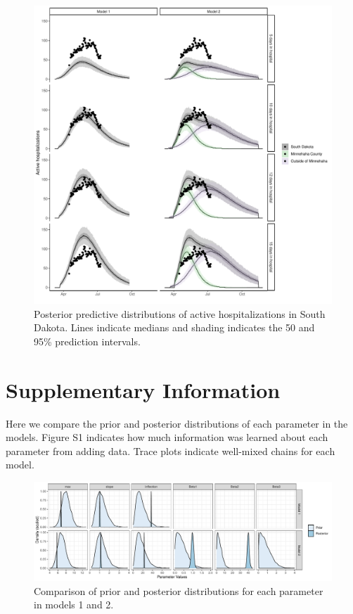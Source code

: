 \documentclass[
]{article}
\begin{document}
\begin{figure}
\centering
\includegraphics{manuscript_files/figure-latex/unnamed-chunk-5-1.pdf}
\caption{\label{fig:unnamed-chunk-5}Posterior predictive distributions of active hospitalizations in South Dakota. Lines indicate medians and shading indicates the 50 and 95\% prediction intervals.\label{active_daily_group:plot}}
\end{figure}

\newpage

\FloatBarrier

\hypertarget{supplementary-information}{%
\section{Supplementary Information}\label{supplementary-information}}

Here we compare the prior and posterior distributions of each parameter in the models. Figure S1 indicates how much information was learned about each parameter from adding data. Trace plots indicate well-mixed chains for each model.

\begin{figure}
\centering
\includegraphics{manuscript_files/figure-latex/unnamed-chunk-6-1.pdf}
\caption{\label{fig:unnamed-chunk-6}Comparison of prior and posterior distributions for each parameter in models 1 and 2.}
\end{figure}
\end{document}
